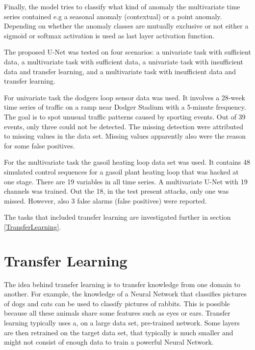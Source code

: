 Finally, the model tries to classify what kind of anomaly the multivariate time series contained e.g a seasonal anomaly (contextual) or a point anomaly. Depending on whether the anomaly classes are mutually exclusive or not either a sigmoid or softmax activation is used as last layer activation function.

The proposed U-Net was tested on four scenarios: a univariate task with sufficient data, a multivariate task with sufficient
data, a univariate task with insufficient data and transfer learning, and a multivariate task with insufficient data and transfer
learning. 

For univariate task the dodgers loop sensor data was used. It involves a 28-week time series of traffic on a ramp near Dodger Stadium with a 5-minute frequency. The goal is to spot unusual traffic patterns caused by sporting events. Out of 39 events, only three could not be detected. The missing detection were attributed to missing values in the data set. Missing values apparently also were the reason for some false positives.

For the multivariate task the gasoil heating loop data set was used. It contains 48 simulated control sequences for a gasoil plant heating loop that was hacked at one stage. There are 19 variables in all time series. A multivariate U-Net with 19 channels was trained. Out the 18, in the test present attacks, only one was missed. However, also 3 false alarms (false positives) were reported. 

The tasks that included transfer learning are investigated further in section \ref{TransferLearning}.

\section{Transfer Learning} \label{Transferlearning}
The idea behind transfer learning is to transfer knowledge from one domain to another. For example, the knowledge of a Neural Network that classifies pictures of dogs and cats can be used to classify pictures of rabbits. This is possible because all these animals share some features such as eyes or ears. Transfer learning typically uses a, on a large data set, pre-trained network. Some layers are then retrained on the target data set, that typically is much smaller and might not consist of enough data to train a powerful Neural Network.

